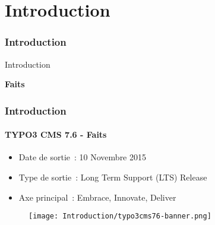 %

\section{Introduction}
\begin{frame}[fragile]
	\frametitle{Introduction}

	\begin{center}\huge{Introduction}\end{center}
	\begin{center}\huge{\color{typo3darkgrey}\textbf{Faits}}\end{center}

\end{frame}

\begin{frame}[fragile]
	\frametitle{Introduction}
	\framesubtitle{TYPO3 CMS 7.6 - Faits}

	\begin{itemize}
		\item Date de sortie~: 10 Novembre 2015
		\item Type de sortie~:
			\begingroup\color{red}Long Term Support (LTS) Release\endgroup
		\item Axe principal~: Embrace, Innovate, Deliver
	\end{itemize}

	\begin{figure}
		\texttt{[image: Introduction/typo3cms76-banner.png]}
	\end{figure}

\end{frame}

